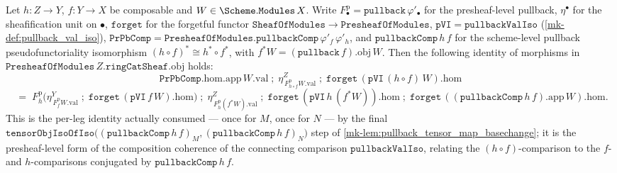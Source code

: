 \begin{lemma}\label{mk-lem:pullback_val_iso_comp}
  \leanok

  Let \(h : Z \to Y\), \(f : Y \to X\) be composable and \(W \in \Scheme.\mathtt{Modules}\,X\).
  Write \(F^{\mathrm p}_\bullet = \mathtt{pullback}\,\varphi'_\bullet\) for the presheaf-level
  pullback, \(\eta^\bullet\) for the sheafification unit on \(\bullet\), \(\mathtt{forget}\) for
  the forgetful functor \(\mathtt{SheafOfModules} \to \mathtt{PresheafOfModules}\),
  \(\mathtt{pVI} = \mathtt{pullbackValIso}\) (\ref{mk-def:pullback_val_iso}),
  \(\mathtt{PrPbComp} = \mathtt{PresheafOfModules.pullbackComp}\,\varphi'_f\,\varphi'_h\), and
  \(\mathtt{pullbackComp}\,h\,f\) for the scheme-level pullback pseudofunctoriality isomorphism
  \((h\circ f)^{*} \cong h^{*}\circ f^{*}\), with \(f^{*}W = (\mathtt{pullback}\,f).\mathrm{obj}\,W\).
  Then the following identity of morphisms in
  \(\mathtt{PresheafOfModules}\,Z.\mathtt{ringCatSheaf}.\mathrm{obj}\) holds:
  \[
    \mathtt{PrPbComp}.\mathrm{hom}.\mathrm{app}\,W.\mathrm{val} \;\mathbin{;}\;
      \eta^Z_{\,F^{\mathrm p}_{h\circ f}W.\mathrm{val}} \;\mathbin{;}\;
      \mathtt{forget}\,(\mathtt{pVI}\,(h\circ f)\,W).\mathrm{hom}
  \]
  \[
    \;=\;
    F^{\mathrm p}_h\!\bigl(\eta^Y_{\,F^{\mathrm p}_f W.\mathrm{val}} \;\mathbin{;}\;
        \mathtt{forget}\,(\mathtt{pVI}\,f\,W).\mathrm{hom}\bigr) \;\mathbin{;}\;
      \eta^Z_{\,F^{\mathrm p}_h (f^{*}W).\mathrm{val}} \;\mathbin{;}\;
      \mathtt{forget}\,(\mathtt{pVI}\,h\,(f^{*}W)).\mathrm{hom} \;\mathbin{;}\;
      \mathtt{forget}\,((\mathtt{pullbackComp}\,h\,f).\mathrm{app}\,W).\mathrm{hom}.
  \]
  This is the per-leg identity actually consumed --- once for \(M\), once for \(N\) --- by the
  final \(\mathtt{tensorObjIsoOfIso}\bigl((\mathtt{pullbackComp}\,h\,f)_M,
  (\mathtt{pullbackComp}\,h\,f)_N\bigr)\) step of \ref{mk-lem:pullback_tensor_map_basechange}; it is
  the presheaf-level form of the composition coherence of the connecting comparison
  \(\mathtt{pullbackValIso}\), relating the \((h\circ f)\)-comparison to the \(f\)- and
  \(h\)-comparisons conjugated by \(\mathtt{pullbackComp}\,h\,f\).
\end{lemma}

